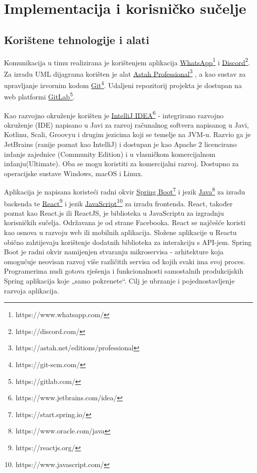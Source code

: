 \chapter{Implementacija i korisničko sučelje}
		
		
		\section{Korištene tehnologije i alati}
			
			 Komunikacija u timu realizirana je korištenjem aplikacija \underline{WhatsApp}\footnote{https://www.whatsapp.com/} i \underline{Discord}\footnote{https://discord.com/}. Za izradu UML dijagrama korišten je alat \underline{Astah Professional}\footnote{https://astah.net/editions/professional} , a kao sustav za upravljanje izvornim kodom \underline{Git}\footnote{https://git-scm.com/}. Udaljeni repozitorij projekta je dostupan na web platformi \underline{GitLab}\footnote{https://gitlab.com/}.
			 
			 Kao razvojno okruženje korišten je \underline{IntelliJ IDEA}\footnote{https://www.jetbrains.com/idea/} - integrirano razvojno okruženje (IDE) napisano u Javi za razvoj računalnog softvera napisanog u Javi, Kotlinu, Scali, Groovyu i drugim jezicima koji se temelje na JVM-u. Razvio ga je JetBrains (ranije poznat kao IntelliJ) i dostupan je kao Apache 2 licencirano izdanje zajednice (Community Edition) i u vlasničkom komercijalnom izdanju(Ultimate). Oba se mogu koristiti za komercijalni razvoj. Dostupno za operacijske sustave Windows, macOS i Linux.
			 
			 Aplikacija je napisana koristeći radni okvir \underline{Spring Boot}\footnote{https://start.spring.io/} i jezik \underline{Java}\footnote{https://www.oracle.com/java} za izradu backenda te \underline{React}\footnote{https://reactjs.org/} i jezik \underline{JavaScript}\footnote{https://www.javascript.com/} za izradu frontenda. React, također poznat kao React.js ili ReactJS, je biblioteka u JavaScriptu za izgradnju korisničkih sučelja. Održavana je od strane Facebooka. React se najčešće koristi kao osnova u razvoju web ili mobilnih aplikacija. Složene aplikacije u Reactu obično zahtijevaju korištenje dodatnih biblioteka za interakciju s API-jem. Spring Boot je radni okvir namijenjen stvaranju mikroservisa - arhitekture koja omogućuje neovisan razvoj više različitih servisa od kojih svaki ima svoj proces. Programerima nudi gotova rješenja i funkcionalnosti samostalnih produkcijskih Spring aplikacija koje „samo pokrenete“. Cilj je ubrzanje i pojednostavljenje razvoja aplikacija.
			 
